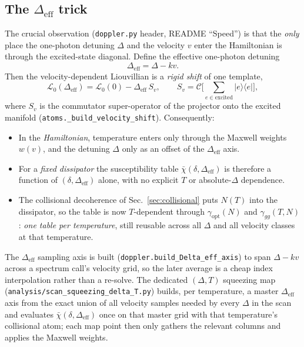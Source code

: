 \documentclass[11pt]{article}
\newcommand{\ketbra}[2]{\lvert #1 \rangle\!\langle #2 \rvert}
\newcommand{\eff}{\mathrm{eff}}
\newcommand{\code}[1]{\texttt{#1}}
\newcommand{\Lcal}{\mathcal{L}}
\newcommand{\rhobar}{\bar{\chi}}
\begin{document}
\subsection{The \boldmath$\Delta_\eff$ trick}

The crucial observation (\code{doppler.py} header, README ``Speed'') is that the
\emph{only} place the one-photon detuning $\Delta$ and the velocity $v$ enter the
Hamiltonian is through the excited-state diagonal. Define the effective one-photon
detuning
\begin{equation}
\Delta_\eff=\Delta-k v.
\end{equation}
Then the velocity-dependent Liouvillian is a \emph{rigid shift} of one template,
\begin{equation}
\Lcal_0(\Delta_\eff)=\Lcal_0(0)-\Delta_\eff\,S_v,
\qquad
S_v=\mathcal{C}\Big[\textstyle\sum_{e\in\text{excited}}\ketbra{e}{e}\Big],
\label{eq:deffshift}
\end{equation}
where $S_v$ is the commutator super-operator of the projector onto the excited
manifold (\code{atoms.\_build\_velocity\_shift}). Consequently:
\begin{itemize}[leftmargin=1.6em]
  \item In the \emph{Hamiltonian}, temperature enters only through the Maxwell
  weights $w(v)$, and the detuning $\Delta$ only as an offset of the
  $\Delta_\eff$ axis.
  \item For a \emph{fixed dissipator} the susceptibility table
  $\rhobar(\delta,\Delta_\eff)$ is therefore a function of
  $(\delta,\Delta_\eff)$ alone, with no explicit $T$ or absolute-$\Delta$
  dependence.
  \item The collisional decoherence of Sec.~\ref{sec:collisional} puts $N(T)$
  into the dissipator, so the table is now $T$-dependent through
  $\gamma_{\text{opt}}(N)$ and $\gamma_{gg}(T,N)$: \emph{one table per
  temperature}, still reusable across all $\Delta$ and all velocity classes at
  that temperature.
\end{itemize}
The $\Delta_\eff$ sampling axis is built (\code{doppler.build\_Delta\_eff\_axis})
to span $\Delta-k v$ across a spectrum call's velocity grid, so the later average
is a cheap index interpolation rather than a re-solve. The dedicated
$(\Delta,T)$ squeezing map (\code{analysis/scan\_squeezing\_delta\_T.py}) builds,
per temperature, a master $\Delta_\eff$ axis from the exact union of all velocity
samples needed by every $\Delta$ in the scan and evaluates
$\rhobar(\delta,\Delta_\eff)$ once on that master grid with that temperature's
collisional atom; each map point then only gathers the relevant columns and
applies the Maxwell weights.
\end{document}

